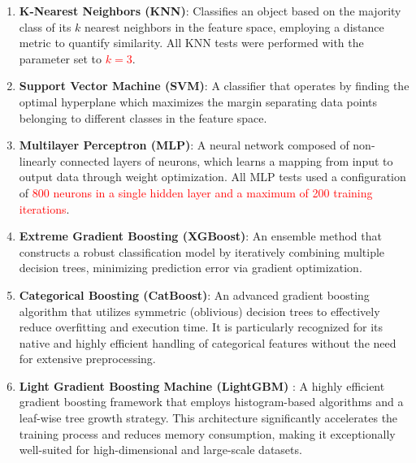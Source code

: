 \documentclass[a4paper,fleqn]{cas-dc}
\begin{document}
\begin{enumerate}
    \item \textbf{K-Nearest Neighbors (KNN)}: Classifies an object based on the majority class of its $k$ nearest neighbors in the feature space, employing a distance metric to quantify similarity. All KNN tests were performed with the parameter set to \textcolor{red}{$k = 3$}.
    \item \textbf{Support Vector Machine (SVM)}: A classifier that operates by finding the optimal hyperplane which maximizes the margin separating data points belonging to different classes in the feature space.
    \item \textbf{Multilayer Perceptron (MLP)}: A neural network composed of non-linearly connected layers of neurons, which learns a mapping from input to output data through weight optimization. All MLP tests used a configuration of \textcolor{red}{800 neurons in a single hidden layer and a maximum of 200 training iterations}.
    \item \textbf{Extreme Gradient Boosting (XGBoost)}: An ensemble method that constructs a robust classification model by iteratively combining multiple decision trees, minimizing prediction error via gradient optimization.
    \item \textbf{Categorical Boosting (CatBoost)}\cite{catboost}: An advanced gradient boosting algorithm that utilizes symmetric (oblivious) decision trees to effectively reduce overfitting and execution time. It is particularly recognized for its native and highly efficient handling of categorical features without the need for extensive preprocessing.
    \item \textbf{Light Gradient Boosting Machine (LightGBM)} \cite{lightgbm}: A highly efficient gradient boosting framework that employs histogram-based algorithms and a leaf-wise tree growth strategy. This architecture significantly accelerates the training process and reduces memory consumption, making it exceptionally well-suited for high-dimensional and large-scale datasets.
\end{enumerate}
\end{document}
